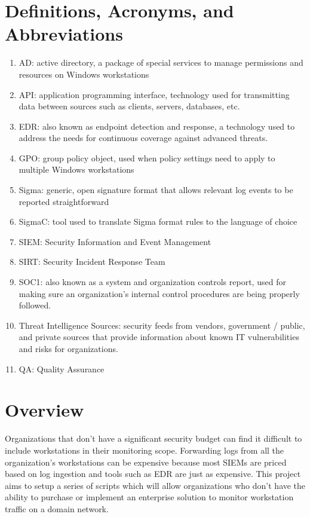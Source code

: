 \documentclass{scrreprt}
\begin{document}
\section{Definitions, Acronyms, and Abbreviations}
\begin{enumerate}
    \item AD: active directory, a package of special services to manage permissions and resources on Windows workstations
    \item API: application programming interface, technology used for transmitting data between sources such as clients, servers, databases, etc.
    \item EDR: also known as endpoint detection and response, a technology used to address the needs for continuous coverage against advanced threats.
    \item GPO: group policy object, used when policy settings need to apply to multiple Windows workstations
    \item Sigma: generic, open signature format that allows relevant log events to be reported straightforward
    \item SigmaC: tool used to translate Sigma format rules to the language of choice
    \item SIEM: Security Information and Event Management
    \item SIRT: Security Incident Response Team
    \item SOC1: also known as a system and organization controls report, used for making sure an organization’s internal control procedures are being properly followed.
    \item Threat Intelligence Sources: security feeds from vendors, government / public, and private sources that provide information about known IT vulnerabilities and risks for organizations.
    \item QA: Quality Assurance
\end{enumerate}

\section{Overview}
Organizations that don’t have a significant security budget can find it difficult to include workstations in their monitoring scope. Forwarding logs from all the organization’s workstations can be expensive because most SIEMs are priced based on log ingestion and tools such as EDR are just as expensive. This project aims to setup a series of scripts which will allow organizations who don’t have the ability to purchase or implement an enterprise solution to monitor workstation traffic on a domain network.
\end{document}
